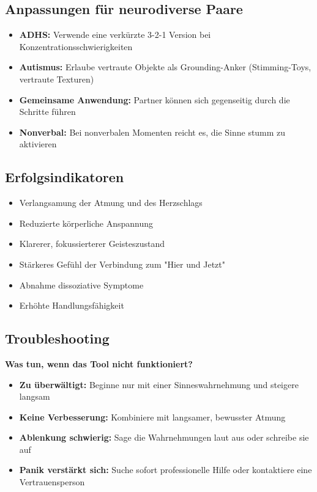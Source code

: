 \subsection{Anpassungen für neurodiverse Paare}

\begin{itemize}
\item \textbf{ADHS:} Verwende eine verkürzte 3-2-1 Version bei Konzentrationsschwierigkeiten
\item \textbf{Autismus:} Erlaube vertraute Objekte als Grounding-Anker (Stimming-Toys, vertraute Texturen)
\item \textbf{Gemeinsame Anwendung:} Partner können sich gegenseitig durch die Schritte führen
\item \textbf{Nonverbal:} Bei nonverbalen Momenten reicht es, die Sinne stumm zu aktivieren
\end{itemize}

\subsection{Erfolgsindikatoren}

\begin{itemize}
\item Verlangsamung der Atmung und des Herzschlags
\item Reduzierte körperliche Anspannung
\item Klarerer, fokussierterer Geisteszustand
\item Stärkeres Gefühl der Verbindung zum "Hier und Jetzt"
\item Abnahme dissoziative Symptome
\item Erhöhte Handlungsfähigkeit
\end{itemize}

\subsection{Troubleshooting}

\textbf{Was tun, wenn das Tool nicht funktioniert?}

\begin{itemize}
\item \textbf{Zu überwältigt:} Beginne nur mit einer Sinneswahrnehmung und steigere langsam
\item \textbf{Keine Verbesserung:} Kombiniere mit langsamer, bewusster Atmung
\item \textbf{Ablenkung schwierig:} Sage die Wahrnehmungen laut aus oder schreibe sie auf
\item \textbf{Panik verstärkt sich:} Suche sofort professionelle Hilfe oder kontaktiere eine Vertrauensperson
\end{itemize}

